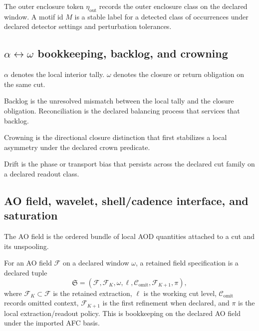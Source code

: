 \begin{definition}
\label{def:outer-enclosure-token}
The outer enclosure token $\eta_{\mathrm{out}}$ records the outer enclosure class on the declared window. A motif id $M$ is a stable label for a detected class of occurrences under declared detector settings and perturbation tolerances.
\end{definition}

\subsection{\texorpdfstring{$\alpha\leftrightarrow\omega$}{alpha-omega} bookkeeping, backlog, and crowning}
\begin{definition}
\label{def:alpha-omega}
$\alpha$ denotes the local interior tally. $\omega$ denotes the closure or return obligation on the same cut.
\end{definition}

\begin{definition}
\label{def:backlog-reconciliation}
Backlog is the unresolved mismatch between the local tally and the closure obligation. Reconciliation is the declared balancing process that services that backlog.
\end{definition}

\begin{definition}[Crowning]
\label{def:crowning}
Crowning is the directional closure distinction that first stabilizes a local asymmetry under the declared crown predicate.
\end{definition}

\begin{definition}[Drift]
\label{def:drift}
Drift is the phase or transport bias that persists across the declared cut family on a declared readout class.
\end{definition}

\subsection{AO field, wavelet, shell/cadence interface, and saturation}
\begin{definition}[AO field]
\label{def:ao-field}
The AO field is the ordered bundle of local AOD quantities attached to a cut and its unspooling.
\end{definition}

\begin{definition}
\label{def:retained-field-specification}
For an AO field \(\mathcal F\) on a declared window \(\omega\), a retained field specification is a declared tuple
\[
\mathfrak S
=
(\mathcal F,\mathcal F_K,\omega,\ell,\mathcal C_{\mathrm{omit}},\mathcal F_{K+1},\pi),
\]
where \(\mathcal F_K\subset\mathcal F\) is the retained extraction, \(\ell\) is the working cut level, \(\mathcal C_{\mathrm{omit}}\) records omitted context, \(\mathcal F_{K+1}\) is the first refinement when declared, and \(\pi\) is the local extraction/readout policy. This is bookkeeping on the declared AO field under the imported AFC basis.
\end{definition}

